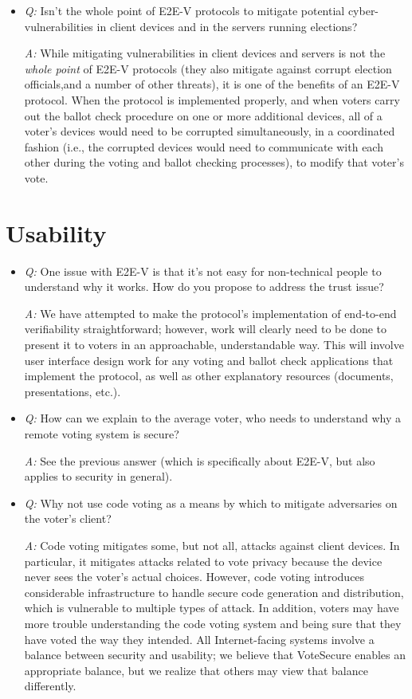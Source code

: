 \documentclass[12pt,letter]{article}
\begin{document}
\begin{itemize}
    \item \emph{Q:} Isn't the whole point of E2E-V protocols to mitigate potential cyber-vulnerabilities in client devices and in the servers running elections?

    \emph{A:} While mitigating vulnerabilities in client devices and servers is not the \emph{whole point} of E2E-V protocols (they also mitigate against corrupt election officials,and a number of other threats), it is one of the benefits of an E2E-V protocol. When the protocol is implemented properly, and when voters carry out the ballot check procedure on one or more additional devices, all of a voter's devices would need to be corrupted simultaneously, in a coordinated fashion (i.e., the corrupted devices would need to communicate with each other during the voting and ballot checking processes), to modify that voter's vote.

\end{itemize}

\section{Usability}

\begin{itemize}

    \item \emph{Q:} One issue with E2E-V is that it's not easy for non-technical people to understand why it works. How do you propose to address the trust issue?

    \emph{A:} We have attempted to make the protocol's implementation of end-to-end verifiability straightforward; however, work will clearly need to be done to present it to voters in an approachable, understandable way. This will involve user interface design work for any voting and ballot check applications that implement the protocol, as well as other explanatory resources (documents, presentations, etc.).

    \item \emph{Q:} How can we explain to the average voter, who needs to understand why a remote voting system is secure?

    \emph{A:} See the previous answer (which is specifically about E2E-V, but also applies to security in general).

    \item \emph{Q:} Why not use code voting as a means by which to mitigate adversaries on the voter's client?

    \emph{A:} Code voting mitigates some, but not all, attacks against client devices. In particular, it mitigates attacks related to vote privacy because the device never sees the voter's actual choices. However, code voting introduces considerable infrastructure to handle secure code generation and distribution, which is vulnerable to multiple types of attack. In addition, voters may have more trouble understanding the code voting system and being sure that they have voted the way they intended. All Internet-facing systems involve a balance between security and usability; we believe that VoteSecure enables an appropriate balance, but we realize that others may view that balance differently.

\end{itemize}
\end{document}
